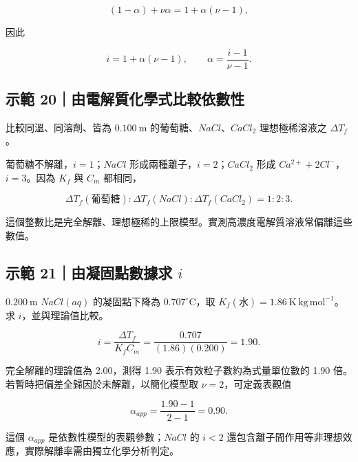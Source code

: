 \documentclass[11pt,a4paper]{article}
\begin{document}
\[
(1-\alpha)+\nu\alpha=1+\alpha(\nu-1),
\]

因此

\[
i=1+\alpha(\nu-1),\qquad
\alpha=\frac{i-1}{\nu-1}.
\]

\begin{HandoutWorkedExample}

\subsection{示範 20｜由電解質化學式比較依數性}\label{ux793aux7bc4-20ux7531ux96fbux89e3ux8ceaux5316ux5b78ux5f0fux6bd4ux8f03ux4f9dux6578ux6027}

比較同溫、同溶劑、皆為 \(0.100\ \mathrm m\) 的葡萄糖、\(NaCl\)、\(CaCl_2\) 理想極稀溶液之 \(\Delta T_f\)。

葡萄糖不解離，\(i=1\)；\(NaCl\) 形成兩種離子，\(i=2\)；\(CaCl_2\) 形成 \(Ca^{2+}+2Cl^-\)，\(i=3\)。因為 \(K_f\) 與 \(C_m\) 都相同，

\[
\Delta T_f(\text{葡萄糖}):\Delta T_f(NaCl):\Delta T_f(CaCl_2)=1:2:3.
\]

這個整數比是完全解離、理想極稀的上限模型。實測高濃度電解質溶液常偏離這些數值。

\end{HandoutWorkedExample}

\begin{HandoutWorkedExample}

\subsection{\texorpdfstring{示範 21｜由凝固點數據求 \(i\)}{示範 21｜由凝固點數據求 i}}\label{ux793aux7bc4-21ux7531ux51ddux56faux9edeux6578ux64daux6c42-i}

\(0.200\ \mathrm m\) \(NaCl(aq)\) 的凝固點下降為 \(0.707^\circ\mathrm C\)，取 \(K_f(\text{水})=1.86\ \mathrm{K\,kg\,mol^{-1}}\)。求 \(i\)，並與理論值比較。

\[
i=\frac{\Delta T_f}{K_fC_m}=\frac{0.707}{(1.86)(0.200)}=1.90.
\]

完全解離的理論值為 2.00，測得 1.90 表示有效粒子數約為式量單位數的 1.90 倍。若暫時把偏差全歸因於未解離，以簡化模型取 \(\nu=2\)，可定義表觀值

\[
\alpha_{app}=\frac{1.90-1}{2-1}=0.90.
\]

這個 \(\alpha_{app}\) 是依數性模型的表觀參數；\(NaCl\) 的 \(i<2\) 還包含離子間作用等非理想效應，實際解離率需由獨立化學分析判定。

\end{HandoutWorkedExample}
\end{document}
